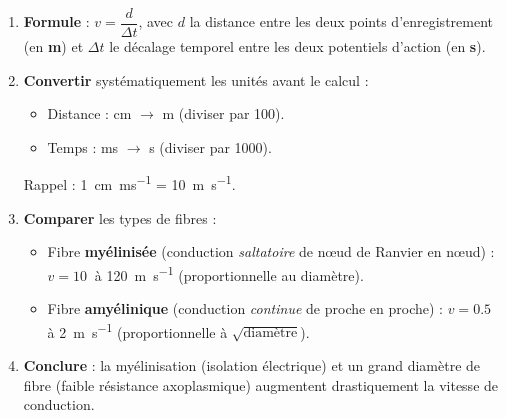 \documentclass[11pt]{article}
\begin{document}
\begin{methode}
\begin{enumerate}
\item \textbf{Formule} : $v = \dfrac{d}{\Delta t}$, avec $d$ la distance entre les deux points d'enregistrement (en \textbf{m}) et $\Delta t$ le décalage temporel entre les deux potentiels d'action (en \textbf{s}).
\item \textbf{Convertir} systématiquement les unités avant le calcul :
\begin{itemize}
\item Distance : cm $\rightarrow$ m (diviser par 100).
\item Temps : ms $\rightarrow$ s (diviser par 1000).
\end{itemize}
Rappel : \SI{1}{cm.ms^{-1}} = \SI{10}{m.s^{-1}}.
\item \textbf{Comparer} les types de fibres :
\begin{itemize}
\item Fibre \textbf{myélinisée} (conduction \emph{saltatoire} de nœud de Ranvier en nœud) : $v = \SI{10}{}$ à \SI{120}{\meter\per\second} (proportionnelle au diamètre).
\item Fibre \textbf{amyélinique} (conduction \emph{continue} de proche en proche) : $v = \SI{0,5}{}$ à \SI{2}{\meter\per\second} (proportionnelle à $\sqrt{\text{diamètre}}$).
\end{itemize}
\item \textbf{Conclure} : la myélinisation (isolation électrique) et un grand diamètre de fibre (faible résistance axoplasmique) augmentent drastiquement la vitesse de conduction.
\end{enumerate}
\end{methode}
\end{document}
